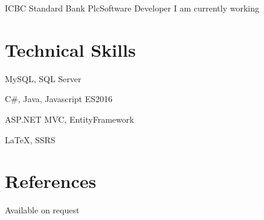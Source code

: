 \documentclass[10pt,a4paper]{moderncv}
\begin{document}
{ICBC Standard Bank Plc}{Software Developer}{}{}
{
	I am currently working 
}




\section{Technical Skills}
{MySQL, SQL Server}
{}
{}

{C\#, Java, Javascript ES2016}
{}
{}

{ASP.NET MVC, EntityFramework}
{}
{}

{LaTeX, SSRS}
{}
{}

\section{References}
\qquad \qquad \qquad \quad Available on request
\end{document}
